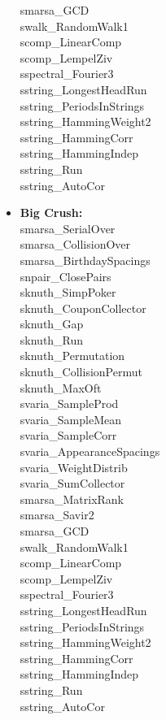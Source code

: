\begin{itemize}
 smarsa\_GCD\\ 
 swalk\_RandomWalk1\\ 
 scomp\_LinearComp \\
 scomp\_LempelZiv\\ 
 sspectral\_Fourier3\\ 
 sstring\_LongestHeadRun \\
 sstring\_PeriodsInStrings\\ 
 sstring\_HammingWeight2\\ 
 sstring\_HammingCorr\\ 
 sstring\_HammingIndep \\
 sstring\_Run\\ 
 sstring\_AutoCor \\ 
\item{\textbf{Big Crush:}}\\smarsa\_SerialOver\\ 
smarsa\_CollisionOver\\ 
smarsa\_BirthdaySpacings\\ 
snpair\_ClosePairs \\ 
sknuth\_SimpPoker\\ 
sknuth\_CouponCollector\\ 
sknuth\_Gap\\ 
sknuth\_Run\\ 
sknuth\_Permutation\\ 
sknuth\_CollisionPermut\\ 
sknuth\_MaxOft\\ 
svaria\_SampleProd\\ 
svaria\_SampleMean\\ 
svaria\_SampleCorr\\ 
svaria\_AppearanceSpacings\\ 
svaria\_WeightDistrib\\ 
svaria\_SumCollector\\ 
smarsa\_MatrixRank\\ 
smarsa\_Savir2\\ 
smarsa\_GCD\\ 
swalk\_RandomWalk1\\ 
scomp\_LinearComp\\ 
scomp\_LempelZiv\\ 
sspectral\_Fourier3\\ 
sstring\_LongestHeadRun\\ 
sstring\_PeriodsInStrings\\ 
sstring\_HammingWeight2\\ 
sstring\_HammingCorr\\ 
sstring\_HammingIndep\\ 
sstring\_Run\\ 
sstring\_AutoCor\\ 


\end{itemize}
